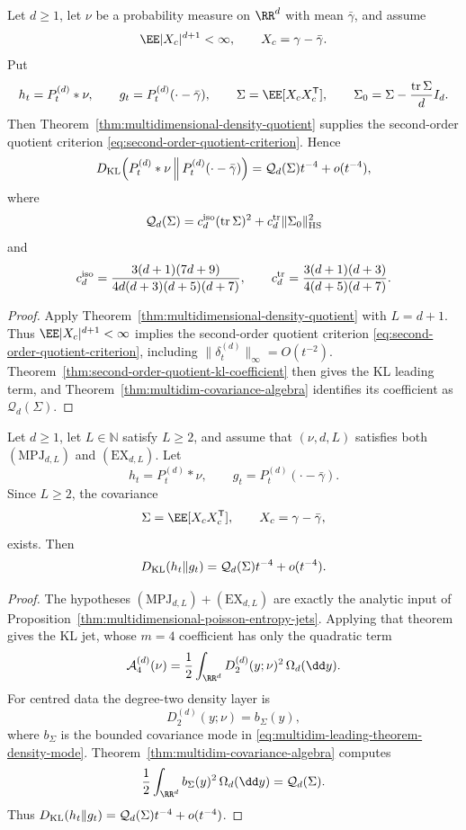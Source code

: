 \begin{corollary}%
\label{cor:finite-dplusone-moment-leading-multidim-coefficient}
Let \(d\ge1\), let \(\nu\) be a probability measure on \(\RR^d\) with mean
\(\bar{\gamma}\), and assume
\[
  \EE |X_c|^{d+1}<\infty,\qquad X_c=\gamma-\bar{\gamma} .
\]
Put
\[
  h_t=P_t^{(d)}*\nu,\qquad
  g_t=P_t^{(d)}(\cdot-\bar{\gamma}),\qquad
  \Sigma=\EE[X_cX_c^{\mathsf T}],\qquad
  \Sigma_0=\Sigma-\frac{\operatorname{tr}\Sigma}{d}I_d .
\]
Then Theorem~\ref{thm:multidimensional-density-quotient} supplies the
second-order quotient criterion
\eqref{eq:second-order-quotient-criterion}.  Hence
\[
D_{\rm KL}\!\left(P_t^{(d)}*\nu\,\middle\|\,
P_t^{(d)}(\cdot-\bar{\gamma})\right)
=\mathcal Q_d(\Sigma)t^{-4}+o(t^{-4}),
\]
where
\[
\mathcal Q_d(\Sigma)
=c_d^{\rm iso}(\operatorname{tr}\Sigma)^2
+c_d^{\rm tr}\|\Sigma_0\|_{\rm HS}^2
\]
and
\[
c_d^{\rm iso}=
\frac{3(d+1)(7d+9)}
{4d(d+3)(d+5)(d+7)},
\qquad
c_d^{\rm tr}=
\frac{3(d+1)(d+3)}
{4(d+5)(d+7)} .
\]
\end{corollary}

\begin{proof}
Apply Theorem~\ref{thm:multidimensional-density-quotient} with
\(L=d+1\).  Thus \(\EE|X_c|^{d+1}<\infty\) implies the second-order quotient criterion
\eqref{eq:second-order-quotient-criterion}, including
\(\|\delta_t^{(d)}\|_\infty=O(t^{-2})\).  Theorem~\ref{thm:second-order-quotient-kl-coefficient}
then gives the KL leading term, and
Theorem~\ref{thm:multidim-covariance-algebra} identifies its
coefficient as \(\mathcal Q_d(\Sigma)\).
\end{proof}

\begin{corollary}%
\label{cor:multidim-leading-kl-coefficient}
Let \(d\ge1\), let \(L\in\mathbb N\) satisfy \(L\ge2\), and assume that
\((\nu,d,L)\) satisfies both \((\mathrm{MPJ}_{d,L})\) and
\((\mathrm{EX}_{d,L})\).  Let
\[
h_t=P_t^{(d)}*\nu,\qquad
g_t=P_t^{(d)}(\cdot-\bar{\gamma}).
\]
Since \(L\ge2\), the covariance
\[
\Sigma=\EE[X_cX_c^{\mathsf T}],\qquad X_c=\gamma-\bar{\gamma},
\]
exists.  Then
\[
D_{\rm KL}(h_t\|g_t)
=\mathcal Q_d(\Sigma)t^{-4}+o(t^{-4}).
\]
\end{corollary}

\begin{proof}
The hypotheses \((\mathrm{MPJ}_{d,L})+(\mathrm{EX}_{d,L})\) are exactly the
analytic input of Proposition~\ref{thm:multidimensional-poisson-entropy-jets}.
Applying that theorem gives the KL jet, whose \(m=4\) coefficient has only the quadratic
term
\[
\mathcal A_4^{(d)}(\nu)
=\frac12\int_{\RR^d}D_2^{(d)}(y;\nu)^2\,\Omega_d(\dd y).
\]
For centred data the degree-two density layer is
\[
D_2^{(d)}(y;\nu)=b_\Sigma(y),
\]
where \(b_\Sigma\) is the bounded covariance mode in
\eqref{eq:multidim-leading-theorem-density-mode}.  Theorem~\ref{thm:multidim-covariance-algebra}
computes
\[
\frac12\int_{\RR^d}b_\Sigma(y)^2\,\Omega_d(\dd y)=\mathcal Q_d(\Sigma).
\]
Thus \(D_{\rm KL}(h_t\|g_t)=\mathcal Q_d(\Sigma)t^{-4}+o(t^{-4})\).
\end{proof}

